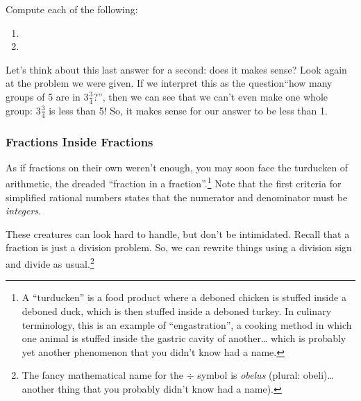 \begin{boxedex}
Compute each of the following:

\begin{enumerate}[itemsep=10pt]
\item {}

\item {}
\end{enumerate}
Let's think about this last answer for a second: does it makes sense? Look again at the problem we were given. If we interpret this as the question``how many groups of 5 are in $3\frac{3}{4}$?'', then we can see that we can't even make one whole group: $3\frac{3}{4}$ is less than 5! So, it makes sense for our answer to be less than 1.
\end{boxedex}

\subsubsection*{Fractions Inside Fractions}

As if fractions on their own weren't enough, you may soon face the turducken of arithmetic, the dreaded ``fraction in a fraction''.\footnote{A ``turducken'' is a food product where a deboned chicken is stuffed inside a deboned duck, which is then stuffed inside a deboned turkey. In culinary terminology, this is an example of ``engastration'', a cooking method in which one animal is stuffed inside the gastric cavity of another\ldots{} which is probably yet another phenomenon that you didn't know had a name.} Note that the first criteria for simplified rational numbers states that the numerator and denominator must be \textit{integers}.

These creatures can look hard to handle, but don't be intimidated. Recall that a fraction is just a division problem. So, we can rewrite things using a division sign and divide as usual.\footnote{The fancy mathematical name for the $\div$ symbol is \textit{obelus} (plural: obeli)\ldots{} another thing that you probably didn't know had a name).}

